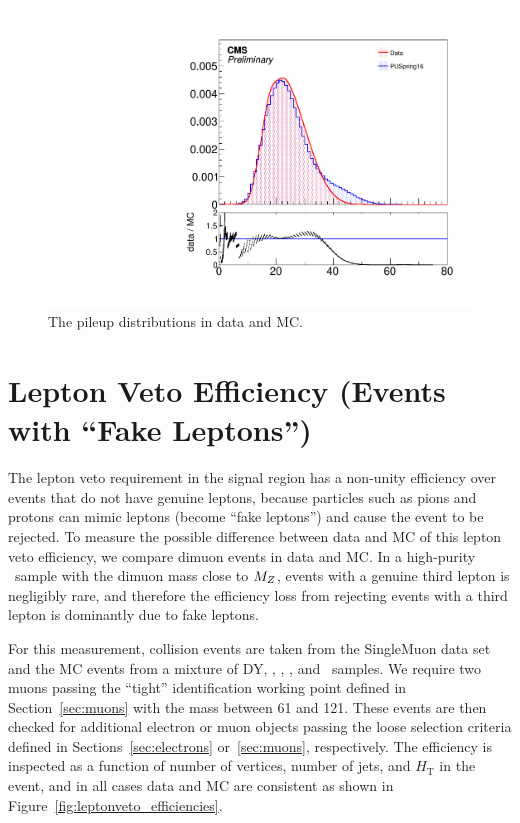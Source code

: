 \begin{figure}[htbp]
  \centering
  \includegraphics[width=0.48\linewidth]{Calibration/Figures/PUMoriond17.pdf}
  \caption{
    The pileup distributions in data and MC.
  }
  \label{fig:pudist}
\end{figure}

\section{Lepton Veto Efficiency (Events with ``Fake Leptons'')}
\label{sec:fake_lepton_veto}
The lepton veto requirement in the signal region has a non-unity efficiency over events that do not have genuine leptons, because particles such as pions and protons can mimic leptons (become ``fake leptons'') and cause the event to be rejected. 
To measure the possible difference between data and MC of this lepton veto efficiency, we compare dimuon events in data and MC. 
In a high-purity \Zmm\  sample with the dimuon mass close to $M_{{Z}}$, events with a genuine third lepton is negligibly rare, and therefore the efficiency loss from rejecting events with a third lepton is dominantly due to fake leptons.

For this measurement, collision events are taken from the SingleMuon data set and the MC events from a mixture of DY, \ttbar, \PW\PW, \PW\PZ, and \PZ\PZ\ samples. 
We require two muons passing the ``tight'' identification working point defined in Section~\ref{sec:muons} with the mass between 61 and 121\GeV. 
These events are then checked for additional electron or muon objects passing the loose selection criteria defined in Sections~\ref{sec:electrons} or~\ref{sec:muons}, respectively. 
The efficiency is inspected as a function of number of vertices, number of jets, and $H_{\mathrm{T}}$ in the event, and in all cases data and MC are consistent as shown in Figure~\ref{fig:leptonveto_efficiencies}.

